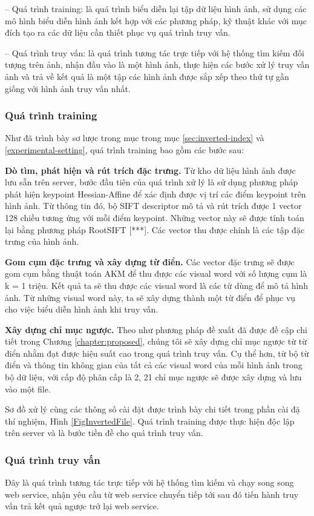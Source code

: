 -- Quá trình training: là quá trình biểu diễn lại tập dữ liệu hình ảnh, sử dụng các mô hình biểu diễn hình ảnh kết hợp với các phương pháp, kỹ thuật khác với mục đích tạo ra các dữ liệu cần thiết phục vụ quá trình truy vấn.

-- Quá trình truy vấn: là quá trình tương tác trực tiếp với hệ thống tìm kiếm đối tượng trên ảnh, nhận đầu vào là một hình ảnh, thực hiện các bước xử lý truy vấn ảnh và trả về kết quả là một tập các hình ảnh được sắp xếp theo thứ tự gần giống với hình ảnh truy vấn nhất.

\subsubsection{Quá trình training}
Như đã trình bày sơ lược trong mục trong mục \ref{sec:inverted-index} và \ref{experimental-setting}, quá trình training bao gồm các bước sau:

\textbf{Dò tìm, phát hiện và rút trích đặc trưng.} Từ kho dữ liệu hình ảnh được lưu sẵn trên server, bước đầu tiên của quá trình xử lý là sử dụng phương pháp phát hiện keypoint Hessian-Affine để xác định được vị trí các điểm keypoint trên hình ảnh. Từ thông tin đó, bộ SIFT descriptor mô tả và rút trích được 1 vector 128 chiều tương ứng với mỗi điểm keypoint. Những vector này sẽ được tính toán lại bằng phương pháp RootSIFT [***]. Các vector thu được chính là các tập đặc trưng của hình ảnh. 

\textbf{Gom cụm đặc trưng và xây dựng từ điển.} Các vector đặc trưng sẽ được gom cụm bằng thuật toán AKM để thu được các visual word với số lượng cụm là k = 1 triệu. Kết quả ta sẽ thu được các visual word là các từ dùng để mô tả hình ảnh. Từ những visual word này, ta sẽ xây dựng thành một từ điển để phục vụ cho việc biểu diễn hình ảnh khi truy vấn.

\textbf{Xây dựng chỉ mục ngược.} Theo như phương pháp đề xuất đã được đề cập chi tiết trong Chương \ref{chapter:proposed}, chúng tôi sẽ xây dựng chỉ mục ngược từ từ điển nhằm đạt được hiệu suất cao trong quá trình truy vấn. Cụ thể hơn, từ bộ từ điển và thông tin không gian của tất cả các visual word của mỗi hình ảnh trong bộ dữ liệu, với cấp độ phân cấp là 2, 21 chỉ mục ngược sẽ được xây dựng và lưu vào một file.

Sơ đồ xử lý cùng các thông số cài đặt được trình bày chi tiết trong phần cài đặ thí nghiệm, Hình \ref{FigInvertedFile}. Quá trình training được thực hiện độc lập trên server và là bước tiền đề cho quá trình truy vấn.

\subsubsection{Quá trình truy vấn}
\label{subsubsection:truyvan_server}
Đây là quá trình tương tác trực tiếp với hệ thống tìm kiếm và chạy song song web service, nhận yêu cầu từ web service chuyển tiếp tới sau đó tiến hành truy vấn trả kết quả ngược trở lại web service.


